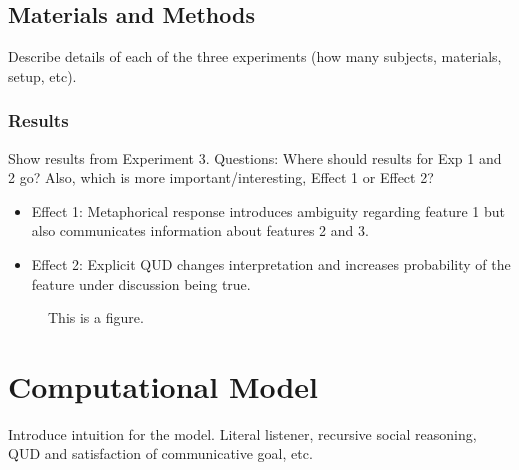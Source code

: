 \documentclass[10pt,letterpaper]{article}
\begin{document}
\subsection{Materials and Methods}

Describe details of each of the three experiments (how many subjects, materials, setup, etc).


\subsubsection{Results}
Show results from Experiment 3.
Questions: Where should results for Exp 1 and 2 go? Also, which is more important/interesting, Effect 1 or Effect 2?
\begin{itemize}
\item[] Effect 1: Metaphorical response introduces ambiguity regarding feature 1 but also communicates information about features 2 and 3. 
\item[] Effect 2: Explicit QUD changes interpretation and increases probability of the feature under discussion being true.
\end{itemize}
 
\begin{figure}[ht]
\begin{center}
\end{center}
\caption{This is a figure.} 
\label{sample-figure}
\end{figure}


\section{Computational Model}
Introduce intuition for the model. Literal listener, recursive social reasoning, QUD and satisfaction of communicative goal, etc.
\end{document}
